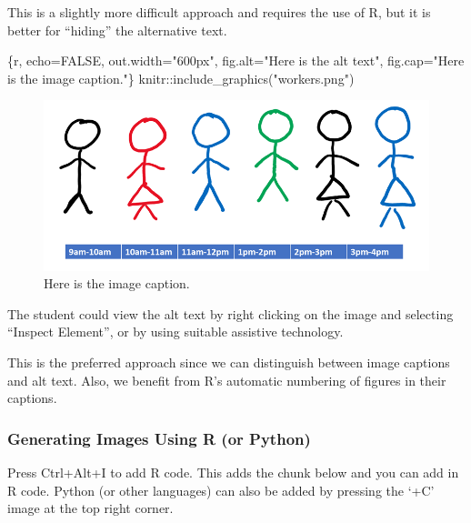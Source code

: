 \documentclass[
  letterpaper,
]{article}
\newenvironment{Shaded}{\begin{snugshade}}{\end{snugshade}}
\newcommand{\InformationTok}[1]{\textcolor[rgb]{0.37,0.37,0.37}{#1}}
\numberwithin{equation}{section}
\numberwithin{figure}{section}
\theoremstyle{break}
\begin{document}
This is a slightly more difficult approach and requires the use of R,
but it is better for ``hiding'' the alternative text.

\begin{Shaded}
\begin{Highlighting}[]
\InformationTok{\textasciigrave{}\textasciigrave{}\textasciigrave{}\{r, echo=FALSE, out.width="600px", fig.alt="Here is the alt text", fig.cap="Here is the image caption."\}}
\InformationTok{    knitr::include\_graphics("workers.png")}
\InformationTok{\textasciigrave{}\textasciigrave{}\textasciigrave{}}
\end{Highlighting}
\end{Shaded}

\begin{figure}[H]

{\centering \includegraphics[width=6.25in,height=\textheight,keepaspectratio]{workers.png}

}

\caption{Here is the image caption.}

\end{figure}%

The student could view the alt text by right clicking on the image and
selecting ``Inspect Element'', or by using suitable assistive
technology.

This is the preferred approach since we can distinguish between image
captions and alt text. Also, we benefit from R's automatic numbering of
figures in their captions.

\subsubsection{Generating Images Using R (or
Python)}\label{generating-images-using-r-or-python}

Press Ctrl+Alt+I to add R code. This adds the chunk below and you can
add in R code. Python (or other languages) can also be added by pressing
the `+C' image at the top right corner.
\end{document}
